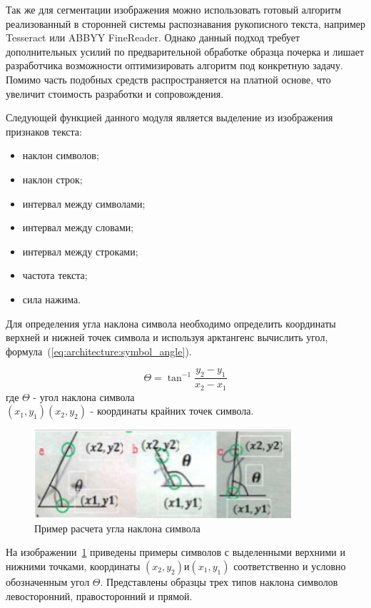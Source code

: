 Так же для сегментации изображения можно использовать готовый алгоритм реализованный в сторонней системы распознавания рукописного текста, например Tesseract или ABBYY FineReader. Однако данный подход требует дополнительных усилий по предварительной обработке образца почерка и лишает разработчика возможности оптимизировать алгоритм под конкретную задачу. Помимо часть подобных средств распространяется на платной основе, что увеличит стоимость разработки и сопровождения.

Следующей функцией данного модуля является выделение из изображения признаков текста:
\begin{itemize}
  \item наклон символов;
  \item наклон строк;
  \item интервал между символами;
  \item интервал между словами;
  \item интервал между строками;
  \item частота текста;
  \item сила нажима.
\end{itemize}

Для определения угла наклона символа необходимо определить координаты верхней и нижней точек символа и используя арктангенс вычислить угол, формула~(\ref{eq:architecture:symbol_angle}).

\begin{equation}
  \label{eq:architecture:symbol_angle}
  \Theta = \tan^{-1}{\frac{y_2 - y_1}{x_2 - x_1}}
\end{equation}
где  $\Theta$ - угол наклона символа \\
     $ (x_1, y_1) (x_2, y_2) $  - координаты крайних точек символа.


\begin{figure}[ht]
    \centering
    \includegraphics[width=0.85\textwidth]{figures/char_angle.png}
    \caption{Пример расчета угла наклона символа}
    \label{fig:architecture:symbol_angle}
\end{figure}

На изображении~\ref{fig:architecture:symbol_angle} приведены примеры символов с выделенными верхними и нижними точками, координаты $ (x_2, y_2) и (x_1, y_1) $ соответственно и условно обозначенным угол $ \Theta $. Представлены образцы трех типов наклона символов левосторонний, правосторонний и прямой.

